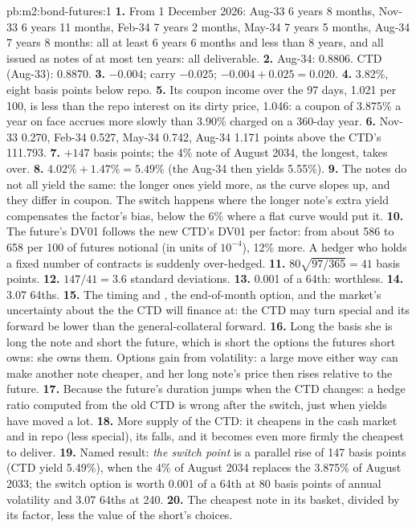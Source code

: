 \begin{solution}{pb:m2:bond-futures:1}
\textbf{1.} From 1 December 2026: Aug-33 6 years 8 months, Nov-33 6 years 11
months, Feb-34 7 years 2 months, May-34 7 years 5 months, Aug-34 7 years 8
months: all at least 6 years 6 months and less than 8 years, and all issued as
notes of at most ten years: all deliverable.
\textbf{2.} Aug-34: 0.8806. CTD (Aug-33): 0.8870.
\textbf{3.}  $-0.004$; carry $-0.025$;  $-0.004 + 0.025 = 0.020$.
\textbf{4.} 3.82\%, eight basis points below repo.
\textbf{5.} Its coupon income over the 97 days, 1.021 per 100, is less than the
repo interest on its dirty price, 1.046: a coupon of 3.875\% a year on face
accrues more slowly than 3.90\% charged on a 360-day year.
\textbf{6.} Nov-33 0.270, Feb-34 0.527, May-34 0.742, Aug-34 1.171 points above the
CTD's 111.793.
\textbf{7.} $+147$ basis points; the 4\% note of August 2034, the longest,
takes over.
\textbf{8.} $4.02\% + 1.47\% = 5.49\%$ (the Aug-34 then yields 5.55\%).
\textbf{9.} The notes do not all yield the same: the longer ones yield more, as
the curve slopes up, and they differ in coupon. The switch happens where the
longer note's extra yield compensates the factor's bias, below the 6\% where
a flat curve would put it.
\textbf{10.} The future's DV01 follows the new CTD's DV01 per factor: from about
586 to 658 per 100 of futures notional (in units of $10^{-4}$), 12\% more. A
hedger who holds a fixed number of contracts is suddenly over-hedged.
\textbf{11.} $80\sqrt{97/365} = 41$ basis points.
\textbf{12.} $147/41 = 3.6$ standard deviations.
\textbf{13.} 0.001 of a 64th: worthless.
\textbf{14.} 3.07 64ths.
\textbf{15.} The timing and , the end-of-month option, and the
market's uncertainty about the  the CTD will finance at: the CTD may
turn special and its forward be lower than the general-collateral forward.
\textbf{16.} Long the basis she is long the note and short the future, which
is short the options the futures short owns: she owns them. Options gain from
volatility: a large move either way can make another note cheaper, and her
long note's price then rises relative to the future.
\textbf{17.} Because the future's duration jumps when the CTD changes: a hedge
ratio computed from the old CTD is wrong after the switch, just when yields
have moved a lot.
\textbf{18.} More supply of the CTD: it cheapens in the cash market and in repo
(less special), its  falls, and it becomes even more firmly the
cheapest to deliver.
\textbf{19.} Named result: \emph{the switch point} is a parallel rise of 147
basis points (CTD yield 5.49\%), when the 4\% of August 2034 replaces the
3.875\% of August 2033; the switch option is worth 0.001 of a 64th at 80 basis
points of annual volatility and 3.07 64ths at 240.
\textbf{20.} The cheapest note in its basket, divided by its factor, less the
value of the short's choices.
\end{solution}


